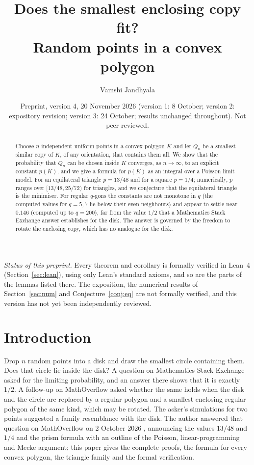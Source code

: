 \documentclass[11pt]{amsart}
\title{Does the smallest enclosing copy fit?\\ Random points in a convex polygon}
\author{Vamshi Jandhyala}
\date{Preprint, version 4, 20 November 2026 (version 1: 8 October; version 2: expository revision; version 3: 24 October; results unchanged throughout). Not peer reviewed.}
\theoremstyle{remark}\newtheorem{remark}[theorem]{Remark}
\begin{document}
\begin{abstract}
Choose $n$ independent uniform points in a convex polygon $K$ and let $Q_n$ be a smallest similar copy of $K$, of any
orientation, that contains them all. We show that the probability that $Q_n$ can be chosen inside $K$ converges, as
$n\to\infty$, to an explicit constant $p(K)$, and we give a formula for $p(K)$ as an integral over a Poisson limit
model. For an equilateral triangle $p=13/48$ and for a square $p=1/4$; numerically, $p$ ranges over $[13/48,25/72)$ for
triangles, and we conjecture that the equilateral triangle is the minimiser. For regular $q$-gons the constants
are not monotone in $q$ (the computed values for $q=5,7$ lie below their even neighbours) and appear to settle near $0.146$ (computed up to $q=200$), far from the value $1/2$
that a Mathematics Stack Exchange answer establishes for the disk. The answer is
governed by the freedom to rotate the enclosing copy, which has no analogue for the disk.
\end{abstract}
\maketitle

\noindent\emph{Status of this preprint.} Every theorem and corollary is formally verified in Lean~4
(Section~\ref{sec:lean}), using only Lean's standard axioms, and so are the parts of the lemmas listed there. The exposition, the numerical results of
Section~\ref{sec:num} and Conjecture~\ref{conj:eq} are not formally verified, and this version has not yet been
independently reviewed.


\section{Introduction}

Drop $n$ random points into a disk and draw the smallest circle containing them. Does that circle lie inside the
disk? A question on Mathematics Stack Exchange \cite{mse} asked for the limiting probability, and an answer there
shows that it is exactly $1/2$. A follow-up on MathOverflow \cite{mo} asked whether the same holds when the disk and
the circle are replaced by a regular polygon and a smallest enclosing regular polygon of the same kind, which may be
rotated. The asker's simulations for two points suggested a family resemblance with the disk. The author answered
that question on MathOverflow on 2 October 2026 \cite{moans}, announcing the values $13/48$ and $1/4$ and the prism
formula with an outline of the Poisson, linear-programming and Mecke argument; this paper gives the complete proofs,
the formula for every convex polygon, the triangle family and the formal verification.
\end{document}
